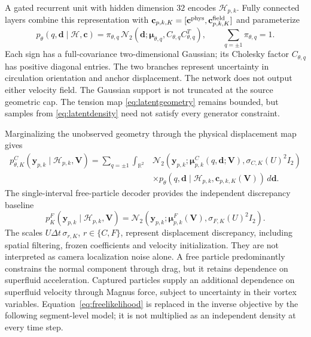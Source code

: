 \documentclass[11pt]{article}
\numberwithin{equation}{section}
\begin{document}
A gated recurrent unit with hidden dimension $32$ encodes $\mathcal H_{p,k}$. Fully connected layers combine this representation with $\mathbf c_{p,k,K}=[\mathbf c^{\rm phys},\mathbf c^{\rm field}_{p,k,K}]$ and parameterize
\begin{equation}
 p_\theta(q,\mathbf d\mid\mathcal H,\mathbf c)
 =\pi_{\theta,q}\,
 \mathcal N_2(\mathbf d;\bm\mu_{\theta,q},C_{\theta,q}C_{\theta,q}^T),
 \qquad \sum_{q=\pm1}\pi_{\theta,q}=1.
 \label{eq:latentdensity}
\end{equation}
Each sign has a full-covariance two-dimensional Gaussian; its Cholesky factor $C_{\theta,q}$ has positive diagonal entries. The two branches represent uncertainty in circulation orientation and anchor displacement. The network does not output either velocity field. The Gaussian support is not truncated at the source geometric cap. The tension map \eqref{eq:latentgeometry} remains bounded, but samples from \eqref{eq:latentdensity} need not satisfy every generator constraint.

Marginalizing the unobserved geometry through the physical displacement map gives
\begin{equation}
 \begin{split}
 p_{\theta,K}^C(\mathbf y_{p,k}\mid\mathcal H_{p,k},\mathbf V)
 =\sum_{q=\pm1}\int_{\mathbb R^2}
 &\mathcal N_2\left(\mathbf y_{p,k};
       \bm\mu^C_{p,k}(q,\mathbf d;\mathbf V),
       \sigma_{C,K}(U)^2I_2\right)\\[-1mm]
 &\times p_\theta(q,\mathbf d\mid\mathcal H_{p,k},
              \mathbf c_{p,k,K}(\mathbf V))\,d\mathbf d.
 \end{split}
 \label{eq:capturedlikelihood}
\end{equation}
The single-interval free-particle decoder provides the independent discrepancy baseline
\begin{equation}
 p_K^F(\mathbf y_{p,k}\mid\mathcal H_{p,k},\mathbf V)
 =\mathcal N_2\left(\mathbf y_{p,k};\bm\mu^F_{p,k}(\mathbf V),
                  \sigma_{F,K}(U)^2I_2\right).
 \label{eq:freelikelihood}
\end{equation}
The scales $U\Delta t\,\sigma_{r,K}$, $r\in\{C,F\}$, represent displacement discrepancy, including spatial filtering, frozen coefficients and velocity initialization. They are not interpreted as camera localization noise alone. A free particle predominantly constrains the normal component through drag, but it retains dependence on superfluid acceleration. Captured particles supply an additional dependence on superfluid velocity through Magnus force, subject to uncertainty in their vortex variables. Equation~\eqref{eq:freelikelihood} is replaced in the inverse objective by the following segment-level model; it is not multiplied as an independent density at every time step.
\end{document}
